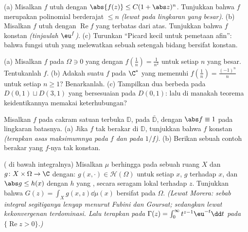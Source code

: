 \begin{exercise}[$\star\star$]\label{exo:b3:holomorphic:4}
(a) Misalkan $f$ utuh dengan $\abs{f(z)} \leq C(1 + \abs
z)^{n}$. Tunjukkan bahwa $f$ merupakan polinomial berderajat $\leq n$
\emph{(lewat  pada lingkaran yang besar)}.
(b) Misalkan $f$ utuh dengan $\operatorname{Re}f$ yang terbatas dari atas.
Tunjukkan bahwa $f$ konstan \emph{(tinjaulah $\eu^{f}$)}.
(c) Turunkan ``Picard kecil untuk pemetaan afin'': bahwa fungsi
utuh yang melewatkan sebuah setengah bidang bersifat konstan.
\end{exercise}

\begin{exercise}[$\star\star$]\label{exo:b3:holomorphic:5}
(a) Misalkan $f$  pada $\Omega \ni 0$ yang  dengan
$f(\frac1n) = \frac1{n^2}$ untuk setiap $n$ yang besar. Tentukanlah $f$.
(b) Adakah suatu $f$  pada $\C^*$ yang memenuhi $f(\frac1n) =
\frac{(-1)^n}{n}$ untuk setiap $n \geq 1$? Benarkanlah.
(c) Tampilkan dua  berbeda pada
$D(0,1)\sqcup D(3,1)$ yang bersesuaian pada $D(0,1)$: lalu di manakah
teorema keidentikannya memakai keterhubungan?
\end{exercise}

\begin{exercise}[$\star\star$]\label{exo:b3:holomorphic:6}
Misalkan $f$  pada cakram satuan terbuka $\mathbb D$,
 pada $\bar{\mathbb D}$, dengan $\abs f \equiv 1$ pada
lingkaran batasnya.
(a) Jika $f$ tak berakar di $\mathbb D$, tunjukkan bahwa $f$ konstan
\emph{(terapkan asas maksimumnya pada $f$ dan pada $1/f$)}.
(b) Berikan sebuah contoh berakar yang $f$-nya tak konstan.
\end{exercise}

\begin{exercise}[$\star\star$]\label{exo:b3:holomorphic:7}
( di bawah integralnya) Misalkan $\mu$  berhingga
pada sebuah ruang $X$ dan $g \colon X\times\Omega \to \C$ dengan:
$g(x, \cdot) \in \mathcal H(\Omega)$ untuk setiap $x$, $g$
 terhadap $x$, dan $\abs g \leq h(x)$ dengan $h$ yang ,
secara seragam lokal terhadap $z$. Tunjukkan bahwa $G(z) = \int_Xg(x, z)\dd\mu(x)$
bersifat  pada $\Omega$. \emph{(Lewat Morera: sebab integral segitiganya
lenyap menurut Fubini dan Goursat; sedangkan  lewat kekonvergenan
terdominasi. Lalu terapkan pada $\Gamma(z) =
\int_0^\infty t^{z-1}\eu^{-t}\dd t$ pada $\{\operatorname{Re}z >
0\}$.)}
\end{exercise}

